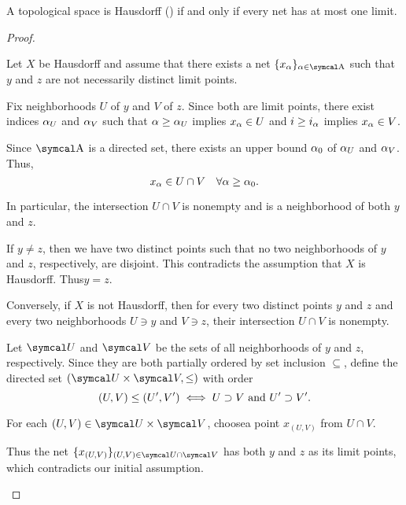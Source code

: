 \begin{proposition}\label{thm:t2_iff_singleton_limits}
  A topological space is Hausdorff () if and only if every net has at most one limit.
\end{proposition}
\begin{proof}\mbox{}
  \begin{description}
    \Implies Let \( X \) be Hausdorff and assume that there exists a net \( \{ x_\al \}_{\al \in \CA} \) such that \( y \) and \( z \) are not necessarily distinct limit points.

    Fix neighborhoods \( U \) of \( y \) and \( V \) of \( z \). Since both are limit points, there exist indices \( \alpha_U \) and \( \alpha_V \) such that \( \alpha \geq \alpha_U \) implies \( x_\alpha \in U \) and \( i \geq i_\alpha \) implies \( x_\alpha \in V \).

    Since \( \CA \) is a directed set, there exists an upper bound \( \alpha_0 \) of \( \alpha_U \) and \( \alpha_V \). Thus,
    \begin{equation*}
      x_\alpha \in U \cap V \quad\forall \alpha \geq \alpha_0.
    \end{equation*}

    In particular, the intersection \( U \cap V \) is nonempty and is a neighborhood of both \( y \) and \( z \).

    If \( y \neq z \), then we have two distinct points such that no two neighborhoods of \( y \) and \( z \), respectively, are disjoint. This contradicts the assumption that \( X \) is Hausdorff. Thus\LEM \( y = z \).

    \ImpliedBy Conversely, if \( X \) is not Hausdorff\LEM, then for every two distinct points \( y \) and \( z \) and every two neighborhoods \( U \ni y \) and \( V \ni z \), their intersection \( U \cap V \) is nonempty.

    Let \( \Cal{U} \) and \( \Cal{V} \) be the sets of all neighborhoods of \( y \) and \( z \), respectively. Since they are both partially ordered by set inclusion \( \subseteq \), define the directed set \( (\Cal{U} \times \Cal{V}, \leq) \) with order
    \begin{equation*}
      (U, V) \leq (U', V') \iff U \supset V \text{ and } U' \supset V'.
    \end{equation*}

    For each \( (U, V) \in \Cal{U} \times \Cal{V} \), choose\AOC a point \( x_{(U, V)} \) from \( U \cap V \).

    Thus the net \( \{ x_{(U, V)} \}_{(U, V) \in \Cal{U} \cap \Cal{V}} \) has both \( y \) and \( z \) as its limit points, which contradicts our initial assumption.
  \end{description}
\end{proof}
